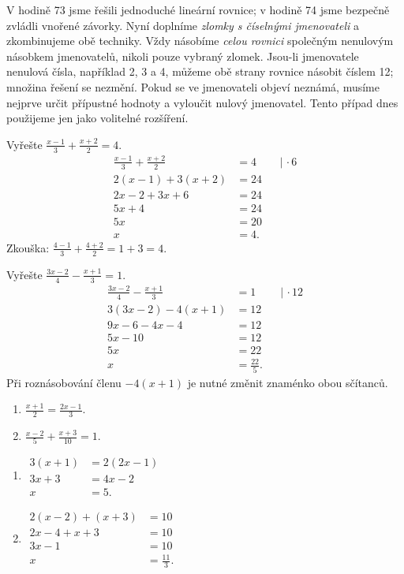 \documentclass[11pt,a4paper]{article}
\begin{document}
V hodině 73 jsme řešili jednoduché lineární rovnice; v hodině 74 jsme bezpečně zvládli vnořené závorky. Nyní doplníme \emph{zlomky s číselnými jmenovateli} a zkombinujeme obě techniky. Vždy násobíme \emph{celou rovnici} společným nenulovým násobkem jmenovatelů, nikoli pouze vybraný zlomek.
Jsou-li jmenovatele nenulová čísla, například 2, 3 a 4, můžeme obě strany rovnice násobit číslem 12; množina řešení se nezmění. Pokud se ve jmenovateli objeví neznámá, musíme nejprve určit přípustné hodnoty a vyloučit nulový jmenovatel. Tento případ dnes použijeme jen jako volitelné rozšíření.
\begin{prikladReseniBox}[title={Příklad 1}]
Vyřešte $\frac{x-1}{3}+\frac{x+2}{2}=4$.
\tcblower
\begin{align*}
\frac{x-1}{3}+\frac{x+2}{2}&=4&&\big|\,\cdot6\\
2(x-1)+3(x+2)&=24\\
2x-2+3x+6&=24\\
5x+4&=24\\
5x&=20\\
x&=4.
\end{align*}
Zkouška: $\frac{4-1}{3}+\frac{4+2}{2}=1+3=4$.
\end{prikladReseniBox}
\begin{prikladReseniBox}[title={Příklad 2}]
Vyřešte $\frac{3x-2}{4}-\frac{x+1}{3}=1$.
\tcblower
\begin{align*}
\frac{3x-2}{4}-\frac{x+1}{3}&=1&&\big|\,\cdot12\\
3(3x-2)-4(x+1)&=12\\
9x-6-4x-4&=12\\
5x-10&=12\\
5x&=22\\
x&=\frac{22}{5}.
\end{align*}
Při roznásobování členu $-4(x+1)$ je nutné změnit znaménko obou sčítanců.
\end{prikladReseniBox}
\begin{zadaniReseniBox}[title={Samostatná práce 1}]
\begin{enumerate}[label=\alph*)]
\item $\frac{x+1}{2}=\frac{2x-1}{3}$.
\item $\frac{x-2}{5}+\frac{x+3}{10}=1$.
\end{enumerate}
\tcblower
\begin{enumerate}[label=\alph*)]
\item $\begin{aligned}3(x+1)&=2(2x-1)\\3x+3&=4x-2\\x&=5.\end{aligned}$
\item $\begin{aligned}2(x-2)+(x+3)&=10\\2x-4+x+3&=10\\3x-1&=10\\x&=\tfrac{11}{3}.\end{aligned}$
\end{enumerate}
\end{zadaniReseniBox}
\end{document}
